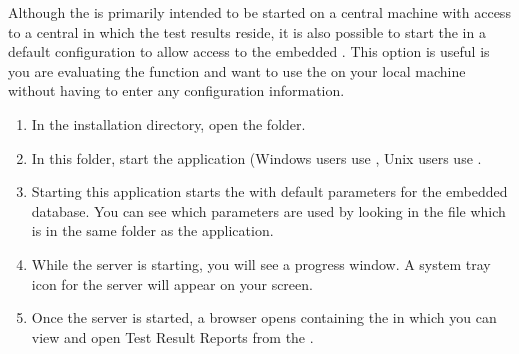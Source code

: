 Although the \dash{} is primarily intended to be started on a central machine with access to a central \gddb{} in which the test results reside, it is also possible to start the \dash{} in a default configuration to allow access to the embedded \gddb{}. This option is useful is you are evaluating the function and want to use the \dash{} on your local machine without having to enter any configuration information. 

\begin{enumerate}
\item In the installation directory, open the  folder. 
\item In this folder, start the  application (Windows users use , Unix users use .  
\item Starting this application starts the  with default parameters for the embedded database. You can see which parameters are used by looking in the  file which is in the same folder as the \dash{} application. 
\item While the server is starting, you will see a progress window. A system tray icon for the \dash{} server will appear on your screen. 
\item Once the server is started, a browser opens containing the \reportpersp{} in which you can view and open Test Result Reports from the \gddb{} . 
\end{enumerate}
